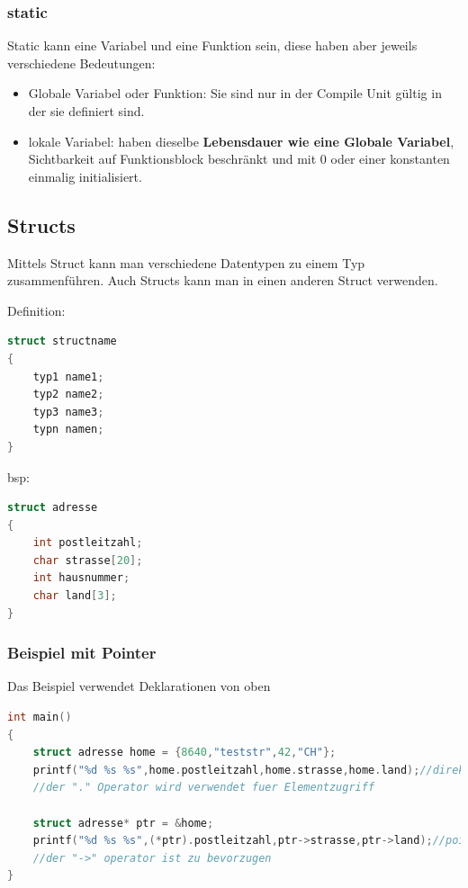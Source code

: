 \subsubsection{static}

Static kann eine Variabel und eine Funktion sein, diese haben aber jeweils verschiedene Bedeutungen:
\begin{itemize}
    \item Globale Variabel oder Funktion:\newline
    Sie sind nur in der Compile Unit gültig in der sie definiert sind.
    \item lokale Variabel:\newline
    haben dieselbe \textbf{Lebensdauer wie eine Globale Variabel}, Sichtbarkeit auf Funktionsblock beschränkt und mit 0 oder einer konstanten  einmalig initialisiert. 
\end{itemize}

\subsection{Structs}

Mittels Struct kann man verschiedene Datentypen zu einem Typ zusammenführen. Auch Structs kann man in einen anderen Struct verwenden.\newline

\noindent
\begin{minipage}{0.5\columnwidth}
Definition:
\begin{lstlisting}[language = c]
struct structname
{
    typ1 name1;
    typ2 name2;
    typ3 name3;
    typn namen;
}
\end{lstlisting}
\end{minipage}
\begin{minipage}{0.5\columnwidth}
bsp:
\begin{lstlisting}[language = c]
struct adresse
{
    int postleitzahl;
    char strasse[20];
    int hausnummer;
    char land[3];
}
\end{lstlisting}
\end{minipage}

\subsubsection{Beispiel mit Pointer}

Das Beispiel verwendet Deklarationen von oben

\begin{lstlisting}[language = c]
int main()
{
    struct adresse home = {8640,"teststr",42,"CH"};
    printf("%d %s %s",home.postleitzahl,home.strasse,home.land);//direkter zugriff
    //der "." Operator wird verwendet fuer Elementzugriff
    
    struct adresse* ptr = &home;
    printf("%d %s %s",(*ptr).postleitzahl,ptr->strasse,ptr->land);//pointer zugriff
    //der "->" operator ist zu bevorzugen
}
\end{lstlisting}

